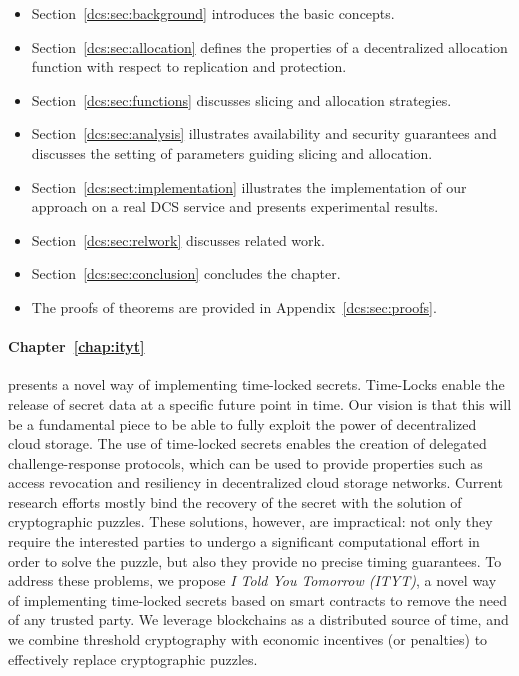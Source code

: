 \begin{itemize}
\item Section~\ref{dcs:sec:background} introduces the basic concepts.
\item Section~\ref{dcs:sec:allocation} defines the properties of a decentralized allocation function with respect to replication and protection.
\item Section~\ref{dcs:sec:functions} discusses slicing and allocation strategies.
\item Section~\ref{dcs:sec:analysis} illustrates availability and security guarantees and discusses the setting of parameters guiding slicing and allocation.
\item Section~\ref{dcs:sect:implementation} illustrates the implementation of our approach on a real DCS service and presents experimental results.
\item Section~\ref{dcs:sec:relwork} discusses related work.
\item Section~\ref{dcs:sec:conclusion} concludes the chapter. 
\item The proofs of theorems are provided in Appendix~\ref{dcs:sec:proofs}.
\end{itemize}

\medskip

\paragraph*{Chapter~\ref{chap:ityt}} presents a novel way of implementing time-locked secrets. Time-Locks enable the release of secret data at a specific future point in time. Our vision is that this will be a fundamental piece to be able to fully exploit the power of decentralized cloud storage. The use of time-locked secrets enables the creation of delegated challenge-response protocols, which can be used to provide properties such as access revocation and resiliency in decentralized cloud storage networks.
%
Current research efforts mostly bind the recovery of the secret with the solution of cryptographic puzzles. These solutions, however, are  impractical: not only they require the interested parties to undergo a significant computational effort in order to solve the puzzle, but also they provide no precise timing guarantees.
%
To address these problems, we propose {\em I {\em Told} You Tomorrow (ITYT)}, a novel way of implementing time-locked secrets based on smart contracts to remove the need of any trusted party. We leverage blockchains as a distributed source of time, and we combine threshold cryptography with economic incentives (or penalties) to effectively replace cryptographic puzzles.

